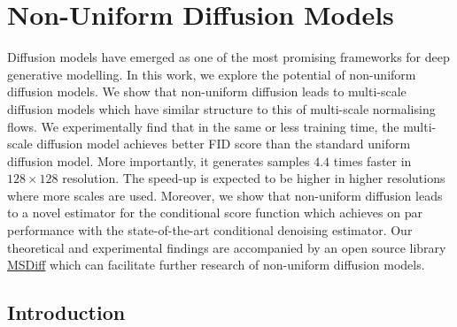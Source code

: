 
\chapter{Non-Uniform Diffusion Models}\label{Chapter:non-uniform-diffusion-models}

\ifpdf
    \graphicspath{{Chapter2/Figs/Raster/}{Chapter2/Figs/PDF/}{Chapter2/Figs/}}
\else
    \graphicspath{{Chapter2/Figs/Vector/}{Chapter2/Figs/}}
\fi


Diffusion models have emerged as one of the most promising frameworks for deep generative modelling. In this work, we explore the potential of non-uniform diffusion models. We show that non-uniform diffusion leads to multi-scale diffusion models which have similar structure to this of multi-scale normalising flows. We experimentally find that in the same or less training time, the multi-scale diffusion model achieves better FID score than the standard uniform diffusion model. More importantly, it generates samples $4.4$ times faster in $128\times 128$ resolution. The speed-up is expected to be higher in higher resolutions where more scales are used. Moreover, we show that non-uniform diffusion leads to a novel estimator for the conditional score function which achieves on par performance with the state-of-the-art conditional denoising estimator. Our theoretical and experimental findings are accompanied by an open source library \href{https://github.com/GBATZOLIS/MSDiff}{MSDiff}
which can facilitate further research of non-uniform diffusion models.

\section{Introduction}


